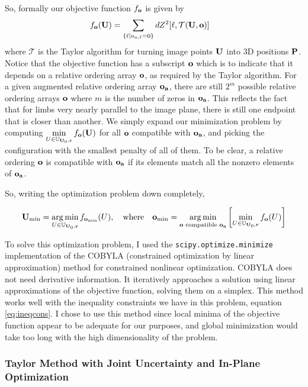 \documentclass[final]{article}
\newcommand{\trm}[1]{\textrm{#1}}
\DeclareMathOperator*{\argmin}{arg\,min}
\newcommand{\code}[1]{\texttt{#1}}
\begin{document}
\begin{spacing}{1.1}
So, formally our objective function $f_{\vb{o}}$ is given by
\begin{align}
  f_{\vb{o}}(\vb{U}) &= \sum_{\qty{\ell | o_{a,\ell} = 0}} dZ^2[\ell,\mathcal{T}(\vb{U},\vb{o})]
  \label{eq:objectivefn}
\end{align}
where $\mathcal{T}$ is the Taylor algorithm for turning image points $\vb{U}$ into 3D positions $\vb{P}$. Notice that the objective function has a subscript $\vb{o}$ which is to indicate that it depends on a relative ordering array $\vb{o}$, as required by the Taylor algorithm. For a given augmented relative ordering array $\vb{o_a}$, there are still $2^m$ possible relative ordering arrays $\vb{o}$ where $m$ is the number of zeros in $\vb{o_a}$. This reflects the fact that for limbs very nearly parallel to the image plane, there is still one endpoint that is closer than another. We simply expand our minimization problem by computing $\displaystyle\min_{U \in \mathbb{U}_{\vb{U}_0,\vb{r}}}f_{\vb{o}}(\vb{U})$ for all $\vb{o}$ compatible with $\vb{o_a}$, and picking the configuration with the smallest penalty of all of them. To be clear, a relative ordering $\vb{o}$ is compatible with $\vb{o_a}$ if its elements match all the nonzero elements of $\vb{o_a}$.

So, writing the optimization problem down completely,

\begin{align}
  \vb{U}_{\trm{min}} = \argmin_{U \in \mathbb{U}_{\vb{U}_0,\vb{r}}} f_{\vb{o}_{\trm{min}}}(U), \qq{where} \vb{o}_{\trm{min}} = \argmin_{\vb{o} \trm{ compatible } \vb{o_a}} \qty[ \min_{U \in \mathbb{U}_{\vb{U}_0,\vb{r}}} f_{\vb{o}}(U)]
  \label{eq:optformal}
\end{align}

To solve this optimization problem, I used the \code{scipy.optimize.minimize} implementation of the COBYLA (constrained optimization by linear approximation) method for constrained nonlinear optimization. COBYLA does not need derivative information. It iteratively approaches a solution using linear approximations of the objective function, solving them on a simplex. This method works well with the inequality constraints we have in this problem, equation \ref{eq:ineqcons}. I chose to use this method since local minima of the objective function appear to be adequate for our purposes, and global minimization would take too long with the high dimensionality of the problem. 

\subsubsection{Taylor Method with Joint Uncertainty and In-Plane Optimization}


\end{spacing}
\end{document}
